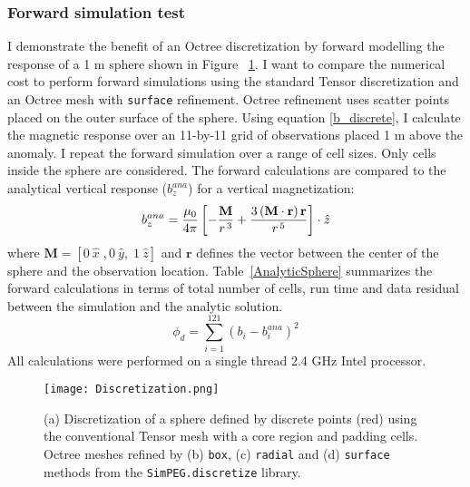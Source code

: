 \subsubsection{Forward simulation test}
I demonstrate the benefit of an Octree discretization by forward modelling the response of a 1 m sphere shown in Figure~ \ref{Discretization}. I want to compare the numerical cost to perform forward simulations using the standard Tensor discretization and an Octree mesh with \texttt{surface} refinement.
Octree refinement uses scatter points placed on the outer surface of the sphere. Using equation \eqref{b_discrete}, I calculate the magnetic response over an 11-by-11 grid of observations placed 1 m above the anomaly. I repeat the forward simulation over a range of cell sizes. Only cells inside the sphere are considered.
The forward calculations are compared to the analytical vertical response ($b_z^{ana}$) for a vertical magnetization:
\begin{equation}
b_z^{ana} = \frac{\mu_0}{4\pi}\left[ -\frac{{\bf M}}{r^{\,3}} + \frac{3\,({\bf M}\cdot{\bf r})\,{\bf r}}{r^{\,5}} \right] \cdot \hat z
\end{equation}
where $\mathbf{M}=[0\:\hat x\;, 0\:\hat y,\; 1\:\hat z]$ and $\mathbf{r}$ defines the vector between the center of the sphere and the observation location.
Table~\ref{AnalyticSphere} summarizes the forward calculations in terms of total number of cells, run time and data residual between the simulation and the analytic solution.
\begin{equation}\label{dataResidual}
\phi_d = \sum_{i=1}^{121} (b_{i} - b_{i}^{ana})^2
\end{equation}
All calculations were performed on a single thread 2.4 GHz Intel processor.
\begin{figure}[h!]
{\centering
\texttt{[image: Discretization.png]}}
\caption{(a) Discretization of a sphere defined by discrete points (red) using the conventional Tensor mesh with a core region and padding cells. Octree meshes refined by (b) \texttt{box}, (c) \texttt{radial} and (d) \texttt{surface} methods from the \texttt{SimPEG.discretize} library. }
\label{Discretization}
\end{figure}

